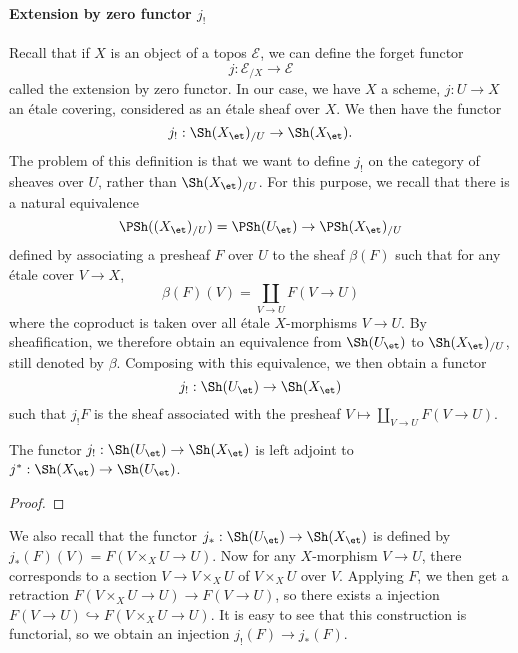 \paragraph{Extension by zero functor \texorpdfstring{$j_!$}{j}}
Recall that if $X$ is an object of a topos $\mathcal{E}$, we can define the forget functor
\[j:\mathcal{E}_{/X}\to\mathcal{E}\]
called the extension by zero functor. In our case, we have $X$ a scheme, $j:U\to X$ an \'etale covering, considered as an \'etale sheaf over $X$. We then have the functor
\[j_!:\Sh(X_\et)_{/U}\to\Sh(X_\et).\]
The problem of this definition is that we want to define $j_!$ on the category of sheaves over $U$, rather than $\Sh(X_\et)_{/U}$. For this purpose, we recall that there is a natural equivalence
\[\PSh((X_\et)_{/U})=\PSh(U_{\et})\to \PSh(X_\et)_{/U}\]
defined by associating a presheaf $F$ over $U$ to the sheaf $\beta(F)$ such that for any \'etale cover $V\to X$,
\[\beta(F)(V)=\coprod_{V\to U} F(V\to U)\]
where the coproduct is taken over all \'etale $X$-morphisms $V\to U$. By sheafification, we therefore obtain an equivalence from $\Sh(U_\et)$ to $\Sh(X_\et)_{/U}$, still denoted by $\beta$. Composing with this equivalence, we then obtain a functor
\[j_!:\Sh(U_\et)\to\Sh(X_\et)\]
such that $j_!F$ is the sheaf associated with the presheaf $V\mapsto\coprod_{V\to U}F(V\to U)$. 

\begin{proposition}\label{scheme etale extension by zero functor adjoint}
The functor $j_!:\Sh(U_\et)\to\Sh(X_\et)$ is left adjoint to $j^*:\Sh(X_\et)\to\Sh(U_\et)$.
\end{proposition}
\begin{proof}
\end{proof}

We also recall that the functor $j_*:\Sh(U_\et)\to\Sh(X_\et)$ is defined by $j_*(F)(V)=F(V\times_XU\to U)$. Now for any $X$-morphism $V\to U$, there corresponds to a section $V\to V\times_XU$ of $V\times_XU$ over $V$. Applying $F$, we then get a retraction $F(V\times_XU\to U)\to F(V\to U)$, so there exists a injection $F(V\to U)\hookrightarrow F(V\times_XU\to U)$. It is easy to see that this construction is functorial, so we obtain an injection $j_!(F)\to j_*(F)$.

